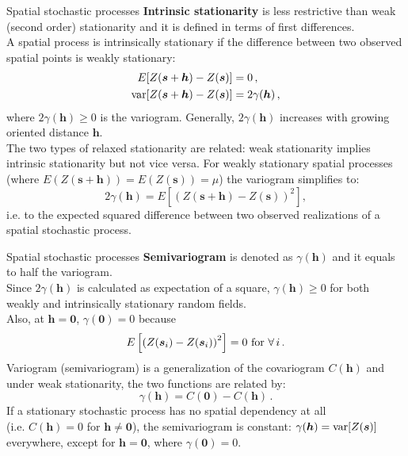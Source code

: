 \documentclass{beamer}
\begin{document}
\begin{frame}{Spatial stochastic processes}
\textbf{Intrinsic stationarity} is less restrictive than weak (second order) stationarity and it is defined in terms of first differences. \\
\smallskip
A spatial process is intrinsically stationary if the difference between two observed spatial points is weakly stationary: 
\begin{equation*} 
\begin{aligned}  
E[Z(\bm{s}+\bm{h})-Z(\bm{s})] &= 0 \,, \\
\textnormal{var}[Z(\bm{s}+\bm{h})-Z(\bm{s})] & = 2\gamma(\bm{h}) \,,
\end{aligned} 
\end{equation*}
where $2\gamma(\bm{h}) \geq 0$ is the variogram. Generally, $2\gamma(\bm{h})$ increases with growing oriented distance $\bm{h}$. \\
\smallskip
The two types of relaxed stationarity are related: weak stationarity implies intrinsic stationarity but not vice versa. For weakly stationary spatial processes (where $E(Z(\bm{s}+\bm{h}))=E(Z(\bm{s}))=\mu$) the variogram simplifies to: 
\begin{equation*}
2\gamma(\bm{h}) = E \left[ \left( Z(\bm{s}+\bm{h}) - Z(\bm{s})  \right)^2 \right],
\end{equation*}
i.e. to the expected squared difference between two observed realizations of a spatial stochastic process. 
\end{frame}
\begin{frame}{Spatial stochastic processes}
\textbf{Semivariogram} is denoted as $\gamma(\bm{h})$ and it equals to half the variogram. \\ \smallskip Since  $2\gamma(\bm{h})$ is calculated as expectation of a square, $\gamma(\bm{h}) \geq 0$ for both weakly and intrinsically stationary random fields. \\ \smallskip Also, at $\bm{h}=\bm{0}$, $\gamma(\bm{0}) = 0$ because 
$$ E \left[ \left( Z(\bm{s}_i) - Z(\bm{s}_i)  \right)^2 \right]=0 \textnormal{~for~} \forall \, i\,.$$
Variogram (semivariogram) is a generalization of the covariogram $C(\bm{h})$ and under weak stationarity, the two functions are related by: 
\begin{equation*}
    \gamma(\bm{h}) = C(\bm{0}) - C(\bm{h})\,.
\end{equation*}
If a stationary stochastic process has no spatial dependency at all \\(i.e. $C(\bm{h})=0$ for $\bm{h}\not =\bm{0}$), the semivariogram is constant: $\gamma(\bm{h}) = \textnormal{var}[Z(\bm{s})]$ everywhere, except for $\bm{h}=\bm{0}$, where $\gamma(\bm{0})=0$. 
\end{frame}
\end{document}
